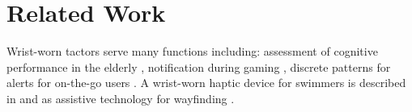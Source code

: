 \documentclass{chi-ext}
\begin{document}





\section{Related Work}
Wrist-worn tactors serve many functions including: assessment of cognitive performance in the elderly \cite{ivorra2008minimally}, notification during gaming \cite{martins2008gauntlet}, discrete patterns for alerts for on-the-go users \cite{lee2010buzzwear,chen2008tactor}. A wrist-worn haptic device for swimmers is described in \cite{forster2009non} and as assistive technology for wayfinding \cite{Jesus-Oliveira:2013aa}.
\end{document}
